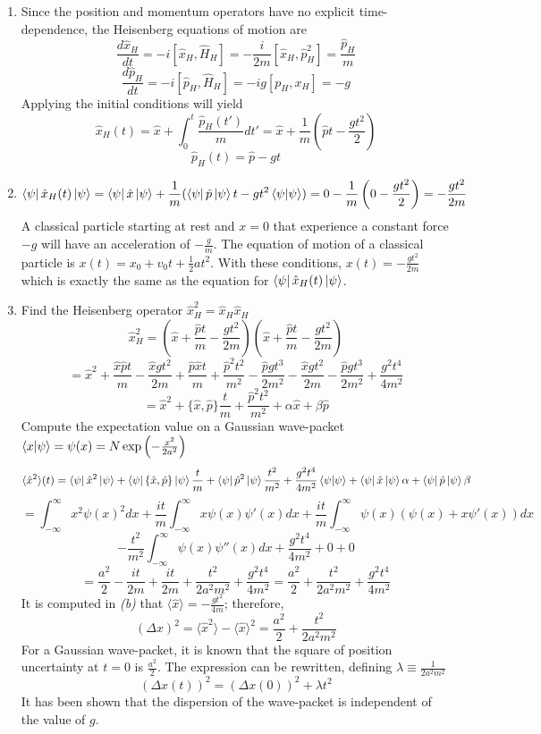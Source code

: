 \begin{sol}
\begin{enumerate}[label=\textbf{(\alph*)}]
\item
Since the position and momentum operators have no explicit time-dependence, the Heisenberg equations of motion are
$$\frac{d\hat x_H}{dt}=-i[\hat x_H,\hat H_H]=-\frac{i}{2m}[\hat x_H,\hat p_H^2]=\frac{\hat p_H}{m}$$
$$\frac{d\hat p_H}{dt}=-i[\hat p_H,\hat H_H]=-ig[p_H, x_H]=-g$$
Applying the initial conditions will yield
$$\hat x_H(t)=\hat x+\int_0^t\frac{\hat p_H(t')}{m}dt'=\hat x+\frac{1}{m}\left(\hat pt-\frac{gt^2}{2}\right)$$
$$\hat p_H(t)=\hat p-gt$$ 
\item
$$\bra\psi\hat x_H(t)\ket\psi=\bra\psi\hat x\ket\psi+\frac{1}{m}(\bra\psi\hat p\ket\psi t-gt^2\braket{\psi}{\psi})=0-\frac{1}{m}\left(0-\frac{gt^2}{2}\right)=-\frac{gt^2}{2m}$$
A classical particle starting at rest and $x=0$ that experience a constant force $-g$ will have an acceleration of $-\frac{g}{m}$. The equation of motion of a classical particle is  $x(t)=x_0+v_0t+\frac{1}{2}at^2$. With these conditions, $x(t)=-\frac{gt^2}{2m}$ which is exactly the same as the equation for $\bra\psi\hat x_H(t)\ket\psi$.
\item
Find the Heisenberg operator $\hat x_H^2=\hat x_H\hat x_H$
$$\hat x_H^2=\left(\hat x+\frac{\hat pt}{m}-\frac{gt^2}{2m}\right)\left(\hat x+\frac{\hat pt}{m}-\frac{gt^2}{2m}\right)$$ 
$$=\hat x^2+\frac{\hat x\hat pt}{m}-\frac{\hat xgt^2}{2m}+\frac{\hat p\hat xt}{m}+\frac{\hat p^2t^2}{m^2}-\frac{\hat pgt^3}{2m^2}-\frac{\hat xgt^2}{2m}-\frac{\hat pgt^3}{2m^2}+\frac{g^2t^4}{4m^2}$$ 
$$=\hat x^2+\{\hat x,\hat p\}\frac{t}{m}+\frac{\hat p^2t^2}{m^2}+\alpha\hat x+\beta\hat p$$
Compute the expectation value on a Gaussian wave-packet $\braket{x}{\psi}=\psi(x)=N\exp\left(-\frac{x^2}{2a^2}\right)$ 
$$\langle\hat x^2\rangle(t)=\bra\psi\hat x^2\ket\psi+\bra\psi\{\hat x,\hat p\}\ket\psi\frac{t}{m}+\bra\psi\hat p^2\ket\psi\frac{t^2}{m^2}+\frac{g^2t^4}{4m^2}\braket{\psi}{\psi}+\bra\psi\hat x\ket\psi\alpha+\bra\psi\hat p\ket\psi\beta$$ 
$$=\int_{-\infty}^\infty x^2\psi(x)^2dx+\frac{it}{m}\int_{-\infty}^\infty x\psi(x)\psi'(x)dx+\frac{it}{m}\int_{-\infty}^\infty\psi(x)(\psi(x)+x\psi'(x))dx$$
$$-\frac{t^2}{m^2}\int_{-\infty}^\infty\psi(x)\psi''(x)dx+\frac{g^2t^4}{4m^2}+0+0$$
$$=\frac{a^2}{2}-\frac{it}{2m}+\frac{it}{2m}+\frac{t^2}{2a^2m^2}+\frac{g^2t^4}{4m^2}=\frac{a^2}{2}+\frac{t^2}{2a^2m^2}+\frac{g^2t^4}{4m^2}$$ 
It is computed in \textit{(b)} that $\displaystyle{\langle\hat x\rangle=-\frac{gt^2}{4m}}$; therefore,
$$(\Delta x)^2=\langle\hat x^2\rangle-\langle\hat x\rangle^2=\frac{a^2}{2}+\frac{t^2}{2a^2m^2}$$
For a Gaussian wave-packet, it is known that the square of position uncertainty at $t=0$ is $\frac{a^2}{2}$. The expression can be rewritten, defining $\lambda\equiv\frac{1}{2a^2m^2}$
$$(\Delta x(t))^2=(\Delta x(0))^2+\lambda t^2$$
It has been shown that the dispersion of the wave-packet is independent of the value of $g$.

\end{enumerate}
\end{sol}